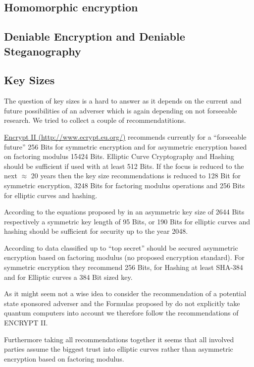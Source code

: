 \subsection{Homomorphic encryption}

\subsection{Deniable Encryption and Deniable Steganography}

\subsection{Key Sizes\label{sec:keySize}}
The question of key sizes is a hard to answer as it depends on the current and future possibilities of an adverser which is again depending on not forseeable research. We tried to collect a couple of recommendatitions.

\href{http://www.ecrypt.eu.org/}{Encrypt II (http://www.ecrypt.eu.org/)} recommends currently for a ``forseeable future'' 256 Bits for symmetric encryption and for asymmetric encryption based on factoring modulus 15424 Bits. Elliptic Curve Cryptography and Hashing should be sufficient if used with at least 512 Bits. If the focus is reduced to the next $\approx$ 20 years then the key size recommendations is reduced to 128 Bit for symmetric encryption, 3248 Bits for factoring modulus operations and 256 Bits for elliptic curves and hashing.

According to the equations proposed by \citeauthor{Lenstra04keylength.} in \cite{Lenstra04keylength.} an asymmetric key size of 2644 Bits respectively a symmetric key length of 95 Bits, or 190 Bits for elliptic curves and hashing should be sufficient for security up to the year 2048. 

According to \cite{nsa-fact-sheet-B} data classified up to ``top secret'' should be secured asymmetric encryption based on factoring modulus (no proposed encryption standard).  For symmetric encryption they recommend 256 Bits, for Hashing at least SHA-384 and for Elliptic curves a 384 Bit sized key.

As it might seem not a wise idea to consider the recommendation of a potential state sponsored adverser and the Formulas proposed by \citeauthor{Lenstra04keylength.} do not explicitly take quantum computers into account we therefore follow the recommendations of ENCRYPT II.

Furthermore taking all recommendations together it seems that all involved parties assume the biggest trust into elliptic curves rather than asymmetric encryption based on factoring modulus.

